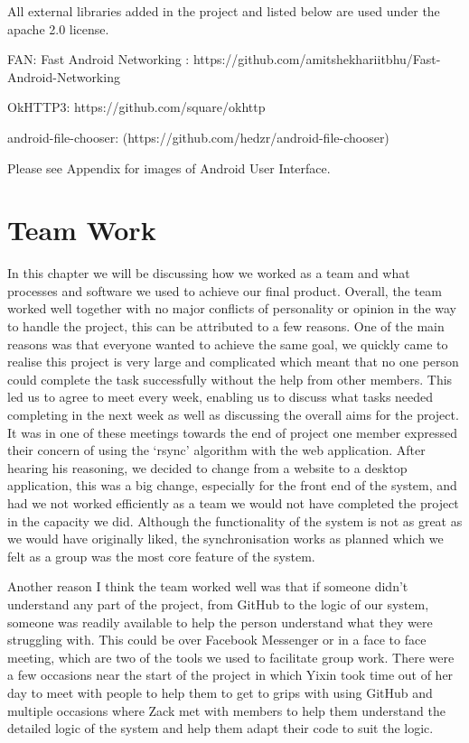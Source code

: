 \documentclass[11pt]{article}
\begin{document}
All external libraries added in the project and listed below are used under the apache 2.0 license. 

FAN: Fast Android Networking : https://github.com/amitshekhariitbhu/Fast-Android-Networking

	OkHTTP3: https://github.com/square/okhttp
	
android-file-chooser: (https://github.com/hedzr/android-file-chooser)

Please see Appendix for images of Android User Interface.


\section{Team Work}

In this chapter we will be discussing how we worked as a team and what processes and software we used to achieve our final product. Overall, the team worked well together with no major conflicts of personality or opinion in the way to handle the project, this can be attributed to a few reasons. One of the main reasons was that everyone wanted to achieve the same goal, we quickly came to realise this project is very large and complicated which meant that no one person could complete the task successfully without the help from other members. This led us to agree to meet every week, enabling us to discuss what tasks needed completing in the next week as well as discussing the overall aims for the project. It was in one of these meetings towards the end of project one member expressed their concern of using the ‘rsync’ algorithm with the web application. After hearing his reasoning, we decided to change from a website to a desktop application, this was a big change, especially for the front end of the system, and had we not worked efficiently as a team we would not have completed the project in the capacity we did. Although the functionality of the system is not as great as we would have originally liked, the synchronisation works as planned which we felt as a group was the most core feature of the system.

Another reason I think the team worked well was that if someone didn’t understand any part of the project, from GitHub to the logic of our system, someone was readily available to help the person understand what they were struggling with. This could be over Facebook Messenger or in a face to face meeting, which are two of the tools we used to facilitate group work. There were a few occasions near the start of the project in which Yixin took time out of her day to meet with people to help them to get to grips with using GitHub and multiple occasions where Zack met with members to help them understand the detailed logic of the system and help them adapt their code to suit the logic.
\end{document}
